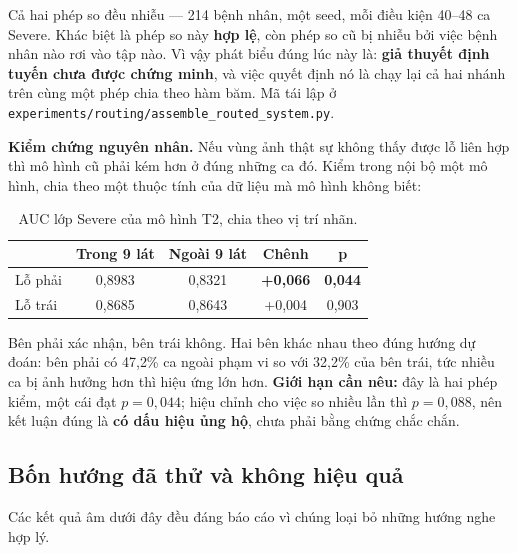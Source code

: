 \documentclass[11pt,a4paper]{article}
\newcommand{\up}[1]{\textcolor{teal!70!black}{\textbf{#1}}}
\begin{document}
Cả hai phép so đều nhiễu --- 214 bệnh nhân, một seed, mỗi điều kiện 40--48 ca Severe. Khác biệt là
phép so này \textbf{hợp lệ}, còn phép so cũ bị nhiễu bởi việc bệnh nhân nào rơi vào tập nào. Vì
vậy phát biểu đúng lúc này là: \textbf{giả thuyết định tuyến chưa được chứng minh}, và việc quyết
định nó là chạy lại cả hai nhánh trên cùng một phép chia theo hàm băm. Mã tái lập ở
\texttt{experiments/routing/assemble\_routed\_system.py}.

\textbf{Kiểm chứng nguyên nhân.} Nếu vùng ảnh thật sự không thấy được lỗ liên hợp thì mô hình cũ
phải kém hơn ở đúng những ca đó. Kiểm trong nội bộ một mô hình, chia theo một thuộc tính của dữ
liệu mà mô hình không biết:

\begin{table}[htbp]
\centering\small
\caption{AUC lớp Severe của mô hình T2, chia theo vị trí nhãn.}
\label{tab:causal}
\begin{tabular}{lcccc}
\toprule
 & \textbf{Trong 9 lát} & \textbf{Ngoài 9 lát} & \textbf{Chênh} & \textbf{p} \\
\midrule
Lỗ phải & 0{,}8983 & 0{,}8321 & \up{+0{,}066} & \textbf{0{,}044} \\
Lỗ trái & 0{,}8685 & 0{,}8643 & +0{,}004 & 0{,}903 \\
\bottomrule
\end{tabular}
\end{table}

Bên phải xác nhận, bên trái không. Hai bên khác nhau theo đúng hướng dự đoán: bên phải có
47{,}2\% ca ngoài phạm vi so với 32{,}2\% của bên trái, tức nhiều ca bị ảnh hưởng hơn thì hiệu ứng
lớn hơn. \textbf{Giới hạn cần nêu:} đây là hai phép kiểm, một cái đạt $p=0{,}044$; hiệu chỉnh cho
việc so nhiều lần thì $p=0{,}088$, nên kết luận đúng là \textbf{có dấu hiệu ủng hộ}, chưa phải
bằng chứng chắc chắn.

\subsection{Bốn hướng đã thử và không hiệu quả}

Các kết quả âm dưới đây đều đáng báo cáo vì chúng loại bỏ những hướng nghe hợp lý.
\end{document}
